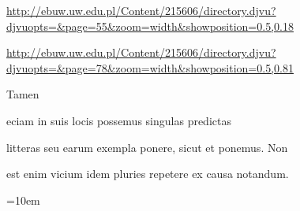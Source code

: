 
\newParkoszpage

{
\url{http://ebuw.uw.edu.pl/Content/215606/directory.djvu?djvuopts=&page=55&zoom=width&showposition=0.5,0.18}

\url{http://ebuw.uw.edu.pl/Content/215606/directory.djvu?djvuopts=&page=78&zoom=width&showposition=0.5,0.81}
}

\bigskip

\obeylines
\mono



\fullpreviouslines


{
\color{blue}

Tamen

eciam in suis locis possemus singulas predictas
}


\fulllines

litteras seu earum exempla ponere, sicut et ponemus. Non

est enim vicium idem pluries repetere ex causa notandum.



\def\splitverse{\advance\plineno by 1\psublineno=0\everypar{\advance\psublineno by 1\llap{\textcolor{green}{\the\ppageno-\ifnum\plineno<10 0\fi\the \plineno-\the\psublineno \ }}\hskip5em}}

\def\fullverselines{\everypar{\advance\plineno by 1\llap{\the\ppageno-\ifnum\plineno<10 0\fi\the \plineno \hskip 1.5em}\hskip5em}}


\def\newverse{\advance\plineno by 1\psublineno=0\hskip10em}
\def\newversesubline{\hskip\indentV}
\def\newverseline{\advance\plineno by 1\psublineno=0}
\newdimen\indentV
\newdimen\indentVt
\indentV=10em
\def\indentVerse{\hskip\indentV{}}
\def\indentVerseTotal{\hskip\indentVt{}}


